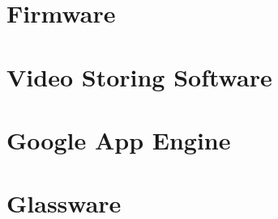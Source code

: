 \section{Firmware}\label{code:firmware}

\section{Video Storing Software}\label{code:video}

\section{Google App Engine}\label{server}

\section{Glassware}


